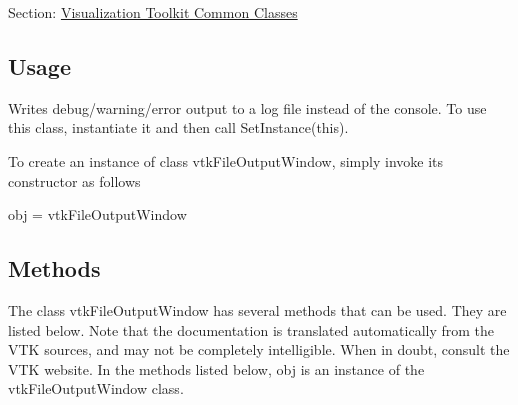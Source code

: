 Section\-: \hyperlink{sec_vtkcommon}{Visualization Toolkit Common Classes} \hypertarget{vtkwidgets_vtkxyplotwidget_Usage}{}\subsection{Usage}\label{vtkwidgets_vtkxyplotwidget_Usage}
Writes debug/warning/error output to a log file instead of the console. To use this class, instantiate it and then call Set\-Instance(this).

To create an instance of class vtk\-File\-Output\-Window, simply invoke its constructor as follows \begin{DoxyVerb}  obj = vtkFileOutputWindow
\end{DoxyVerb}
 \hypertarget{vtkwidgets_vtkxyplotwidget_Methods}{}\subsection{Methods}\label{vtkwidgets_vtkxyplotwidget_Methods}
The class vtk\-File\-Output\-Window has several methods that can be used. They are listed below. Note that the documentation is translated automatically from the V\-T\-K sources, and may not be completely intelligible. When in doubt, consult the V\-T\-K website. In the methods listed below, {\ttfamily obj} is an instance of the vtk\-File\-Output\-Window class. 
